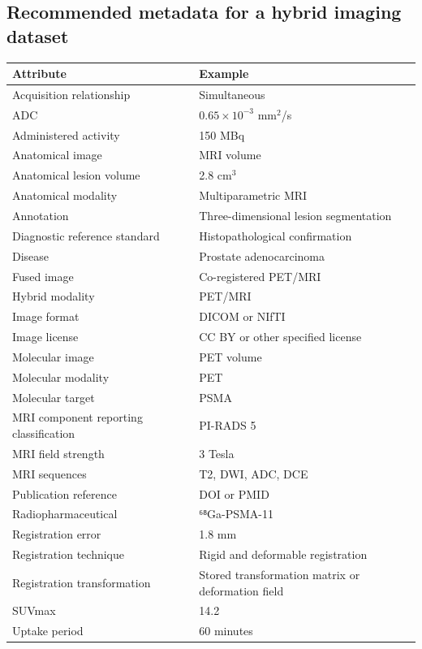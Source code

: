 \subsection{Recommended metadata for a hybrid imaging dataset}
\begin{longtable}{@{}p{}p{}@{}}
\toprule
\textbf{Attribute} & \textbf{Example} \\
\midrule
Acquisition relationship & Simultaneous \\
ADC & $0.65 \times 10^{-3}$ mm$^2$/s \\
Administered activity & 150 MBq \\
Anatomical image & MRI volume \\
Anatomical lesion volume & 2.8 cm$^3$ \\
Anatomical modality & Multiparametric MRI \\
Annotation & Three-dimensional lesion segmentation \\
Diagnostic reference standard & Histopathological confirmation \\
Disease & Prostate adenocarcinoma \\
Fused image & Co-registered PET/MRI \\
Hybrid modality & PET/MRI \\
Image format & DICOM or NIfTI \\
Image license & CC BY or other specified license \\
Molecular image & PET volume \\
Molecular modality & PET \\
Molecular target & PSMA \\
MRI component reporting classification & PI-RADS 5 \\
MRI field strength & 3 Tesla \\
MRI sequences & T2, DWI, ADC, DCE \\
Publication reference & DOI or PMID \\
Radiopharmaceutical & ⁶⁸Ga-PSMA-11 \\
Registration error & 1.8 mm \\
Registration technique & Rigid and deformable registration \\
Registration transformation & Stored transformation matrix or deformation field \\
SUVmax & 14.2 \\
Uptake period & 60 minutes \\
\bottomrule
\end{longtable}

